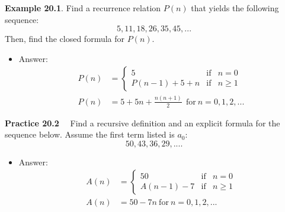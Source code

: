 \documentclass[aspectratio=169]{beamer}
\begin{document}
\begin{frame}[plain]{}


 {\bf Example 20.1}.   
   Find a recurrence relation $P(n)$ that yields the following sequence:
     \[ 5, 11, 18, 26, 35, 45, ... \] %
   Then, find the closed formula for $P(n)$.   
   
   \pause
   
   \begin{itemize}
    \item Answer:
      \begin{align*}
       P(n) &= \left\{  \begin{array}{ccc}
                            5 &\mbox{if}& n=0\\
                            P(n-1)+5+n &\mbox{if}& n\geq 1
                           \end{array} \right.  \\
            P(n) &= 5+5n+\frac{n(n+1)}{2} \ \ \mbox{for}\ n=0,1,2,...                                                       
      \end{align*}  
   \end{itemize}
   
 
   
  \vspace{.7in}
  
\end{frame}

\begin{frame}[plain]{}

  {\bf Practice 20.2}%
\ \      Find a recursive definition and 
 an explicit formula
  for the sequence below. Assume the first term listed is $a_0$:
   \[ 50, 43, 36, 29, .... \]
   
   \pause
   
   \begin{itemize}
    \item Answer:
      \begin{align*}
       A(n) &= \left\{  \begin{array}{ccc}
                            50 &\mbox{if}& n=0\\
                            A(n-1)-7 &\mbox{if}& n\geq 1
                           \end{array} \right.  \\
            A(n) &= 50 - 7n \ \mbox{for}\ n=0,1,2,...                            
      \end{align*}  
   \end{itemize}
   
  \vspace{.7in}
  
\end{frame}
\end{document}
